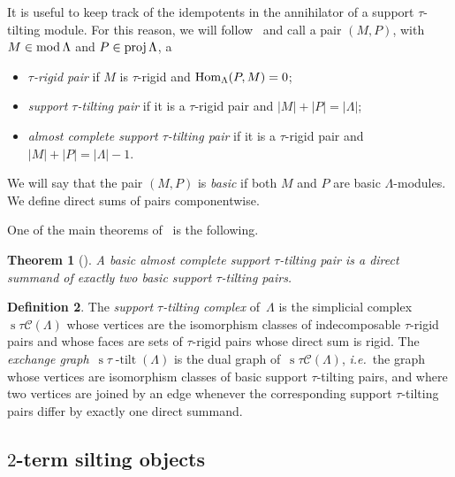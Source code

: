 \documentclass{amsart}
\newtheorem{theorem}{Theorem}%
\theoremstyle{definition}
\newtheorem{definition}[theorem]{Definition}
\newcommand{\ie}{\textit{i.e.}~} %
\newcommand{\darkblue}{\color{darkblue}} %
\newcommand{\defn}[1]{\textsl{\darkblue #1}} %
\newcommand{\stau}{\operatorname{s} \! \tau \! \operatorname{-tilt}}
\newcommand{\tiltingComplex}{\operatorname{s} \! \tau\mathcal{C}}
\newcommand{\MOD}{\mbox{{\rm mod \!}}}
\newcommand{\proj}{\operatorname{{\rm proj }}}
\newcommand{\Hom}[1]{\operatorname{{\rm Hom}}_{#1}}
\begin{document}
It is useful to keep track of the idempotents in the annihilator of a support $\tau$-tilting module.
For this reason, we will follow~\cite[Def.~0.3]{AdachiIyamaReiten} and call a pair $(M,P)$, with $M\in \MOD \Lambda$ and $P\in \proj \Lambda$, a
\begin{itemize}
 \item \defn{$\tau$-rigid pair} if $M$ is $\tau$-rigid and $\Hom{\Lambda}(P,M) = 0$;
 \item \defn{support $\tau$-tilting pair} if it is a $\tau$-rigid pair and $|M| + |P| = |\Lambda|$;
 \item \defn{almost complete support $\tau$-tilting pair} if it is a $\tau$-rigid pair and $|M| + |P| = |\Lambda|-1$.
\end{itemize}
We will say that the pair $(M,P)$ is \defn{basic} if both $M$ and $P$ are basic $\Lambda$-modules.  
We define direct sums of pairs componentwise.

One of the main theorems of~\cite{AdachiIyamaReiten} is the following.

\begin{theorem}[{\cite[Thm.~0.4]{AdachiIyamaReiten}}]
 A basic almost complete support $\tau$-tilting pair is a direct summand of exactly two basic support $\tau$-tilting pairs.
\end{theorem}

\begin{definition}
The \defn{support $\tau$-tilting complex} of~$\Lambda$ is the simplicial complex~$\tiltingComplex(\Lambda)$ whose vertices are the isomorphism classes of indecomposable $\tau$-rigid pairs and whose faces are sets of $\tau$-rigid pairs whose direct sum is rigid.
The \defn{exchange graph}~$\stau(\Lambda)$ is the dual graph of~$\tiltingComplex(\Lambda)$, \ie the graph whose vertices are isomorphism classes of basic support $\tau$-tilting pairs, and where two vertices are joined by an edge whenever the corresponding support $\tau$-tilting pairs differ by exactly one direct summand.
\end{definition}


\subsection{$2$-term silting objects}
\end{document}

